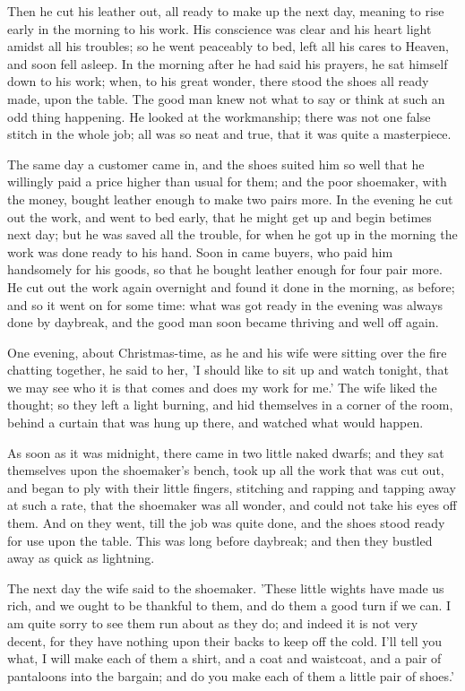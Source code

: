 \documentclass[12pt]{book}
\begin{document}
Then he cut his leather out, all ready to make up the next day,
meaning to rise early in the morning to his work. His conscience was
clear and his heart light amidst all his troubles; so he went
peaceably to bed, left all his cares to Heaven, and soon fell asleep.
In the morning after he had said his prayers, he sat himself down to
his work; when, to his great wonder, there stood the shoes all ready
made, upon the table. The good man knew not what to say or think at
such an odd thing happening. He looked at the workmanship; there was
not one false stitch in the whole job; all was so neat and true, that
it was quite a masterpiece.

The same day a customer came in, and the shoes suited him so well that
he willingly paid a price higher than usual for them; and the poor
shoemaker, with the money, bought leather enough to make two pairs
more. In the evening he cut out the work, and went to bed early, that
he might get up and begin betimes next day; but he was saved all the
trouble, for when he got up in the morning the work was done ready to
his hand. Soon in came buyers, who paid him handsomely for his goods,
so that he bought leather enough for four pair more. He cut out the
work again overnight and found it done in the morning, as before; and
so it went on for some time: what was got ready in the evening was
always done by daybreak, and the good man soon became thriving and
well off again.

One evening, about Christmas-time, as he and his wife were sitting
over the fire chatting together, he said to her, 'I should like to sit
up and watch tonight, that we may see who it is that comes and does my
work for me.' The wife liked the thought; so they left a light
burning, and hid themselves in a corner of the room, behind a curtain
that was hung up there, and watched what would happen.

As soon as it was midnight, there came in two little naked dwarfs; and
they sat themselves upon the shoemaker's bench, took up all the work
that was cut out, and began to ply with their little fingers,
stitching and rapping and tapping away at such a rate, that the
shoemaker was all wonder, and could not take his eyes off them. And on
they went, till the job was quite done, and the shoes stood ready for
use upon the table. This was long before daybreak; and then they
bustled away as quick as lightning.

The next day the wife said to the shoemaker. 'These little wights have
made us rich, and we ought to be thankful to them, and do them a good
turn if we can. I am quite sorry to see them run about as they do; and
indeed it is not very decent, for they have nothing upon their backs
to keep off the cold. I'll tell you what, I will make each of them a
shirt, and a coat and waistcoat, and a pair of pantaloons into the
bargain; and do you make each of them a little pair of shoes.'
\end{document}
